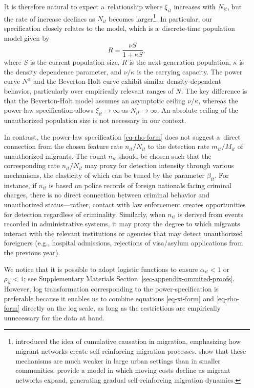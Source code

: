It is therefore natural to expect a~relationship where $\xi_{it}$ increases with $N_{it}$, but the rate of increase declines as $N_{it}$ becomes
larger\footnote{\citet{massey1990social} introduced the idea of
 cumulative causation in migration, emphasizing how migrant networks
 create self-reinforcing migration processes. \citet{fussell2004limits}
 show that these mechanisms are much weaker in large urban settings
 than in smaller communities. \citet{carrington1996migration} provide a
 model in which moving costs decline as migrant networks expand,
 generating gradual self-reinforcing migration dynamics.}. In particular, our
specification closely relates to the \cite{beverton_holt_1957} model, which is a~discrete-time population model given by
\[
R = \frac{\nu S}{1 + \kappa S},
\]
where $S$ is the current population size, $R$ is the next-generation population, $\kappa$ is the density dependence parameter, and $\nu/\kappa$ is the carrying capacity. The power curve $N^{\alpha}$ and the Beverton-Holt curve exhibit similar density-dependent behavior, particularly over empirically relevant ranges of $N$. The key difference is that the Beverton-Holt model assumes an asymptotic ceiling $\nu/\kappa$, whereas the power-law specification allows $\xi_{it} \to \infty$ as $N_{it} \to \infty$. An absolute ceiling of the unauthorized population size is not necessary in our context.

In contrast, the power-law specification \eqref{eq-rho-form} does not suggest a~direct connection from the chosen feature rate $n_{it}/N_{it}$ to the detection rate $m_{it}/M_{it}$ of unauthorized migrants. The count $n_{it}$ should be chosen such that the corresponding rate $n_{it}/N_{it}$ may proxy for detection intensity through various mechanisms, the elasticity of which can be tuned by the parameter $\beta_{it}$. For instance, if $n_{it}$ is based on police records of foreign nationals facing criminal charges, there is no direct connection between criminal behavior and unauthorized status---rather, contact with law enforcement creates opportunities for detection regardless of criminality. Similarly, when $n_{it}$ is derived from events recorded in administrative systems, it may proxy the degree to which migrants interact with the relevant institutions or agencies that may detect unauthorized foreigners (e.g., hospital admissions, rejections of visa/asylum applications from the previous year).

We notice that it is possible to adopt logistic functions to ensure $\alpha_{it} <1$ or $\rho_{it} <1$; see Supplementary Materials Section~\ref{sec-appendix-ommited-proofs}. However, log transformation corresponding to the power-specification is preferable because it enables us to combine equations \eqref{eq-xi-form} and \eqref{eq-rho-form} directly on the log scale, as long as the restrictions are empirically unnecessary for the data at hand.

